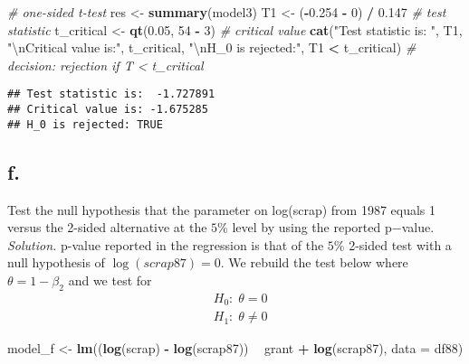 \documentclass[
]{article}
\newenvironment{Shaded}{\begin{snugshade}}{\end{snugshade}}
\newcommand{\CharTok}[1]{\textcolor[rgb]{0.31,0.60,0.02}{#1}}
\newcommand{\CommentTok}[1]{\textcolor[rgb]{0.56,0.35,0.01}{\textit{#1}}}
\newcommand{\DataTypeTok}[1]{\textcolor[rgb]{0.13,0.29,0.53}{#1}}
\newcommand{\DecValTok}[1]{\textcolor[rgb]{0.00,0.00,0.81}{#1}}
\newcommand{\FloatTok}[1]{\textcolor[rgb]{0.00,0.00,0.81}{#1}}
\newcommand{\KeywordTok}[1]{\textcolor[rgb]{0.13,0.29,0.53}{\textbf{#1}}}
\newcommand{\NormalTok}[1]{#1}
\newcommand{\OperatorTok}[1]{\textcolor[rgb]{0.81,0.36,0.00}{\textbf{#1}}}
\newcommand{\StringTok}[1]{\textcolor[rgb]{0.31,0.60,0.02}{#1}}
\begin{document}
\begin{Shaded}
\begin{Highlighting}[]
\CommentTok{# one-sided t-test}
\NormalTok{res <-}\StringTok{ }\KeywordTok{summary}\NormalTok{(model3)}
\NormalTok{T1 <-}\StringTok{ }\NormalTok{(}\OperatorTok{-}\FloatTok{0.254} \OperatorTok{-}\StringTok{ }\DecValTok{0}\NormalTok{) }\OperatorTok{/}\StringTok{ }\FloatTok{0.147} \CommentTok{# test statistic}
\NormalTok{t_critical <-}\StringTok{ }\KeywordTok{qt}\NormalTok{(}\FloatTok{0.05}\NormalTok{, }\DecValTok{54} \OperatorTok{-}\StringTok{ }\DecValTok{3}\NormalTok{) }\CommentTok{# critical value }
\KeywordTok{cat}\NormalTok{(}\StringTok{"Test statistic is: "}\NormalTok{, T1, }\StringTok{"}\CharTok{\textbackslash{}n}\StringTok{Critical value is:"}\NormalTok{, t_critical, }
    \StringTok{"}\CharTok{\textbackslash{}n}\StringTok{H_0 is rejected:"}\NormalTok{, T1 }\OperatorTok{<}\StringTok{ }\NormalTok{t_critical) }\CommentTok{# decision: rejection if T < t_critical}
\end{Highlighting}
\end{Shaded}

\begin{verbatim}
## Test statistic is:  -1.727891 
## Critical value is: -1.675285 
## H_0 is rejected: TRUE
\end{verbatim}

\newpage

\hypertarget{f.}{%
\subsection{f.~}\label{f.}}

Test the null hypothesis that the parameter on log(scrap) from 1987
equals 1 versus the 2-sided alternative at the \(5\%\) level by using
the reported p−value. \newline \newline \emph{Solution.} p-value
reported in the regression is that of the \(5\%\) 2-sided test with a
null hypothesis of \(\log(scrap87) = 0\). We rebuild the test below
where \(\theta = 1 - \beta_2\) and we test for \[\begin{aligned}
&H_0:\;\theta = 0 \\
&H_1 : \; \theta \ne 0
\end{aligned}\]

\begin{Shaded}
\begin{Highlighting}[]
\NormalTok{model_f <-}\StringTok{ }\KeywordTok{lm}\NormalTok{((}\KeywordTok{log}\NormalTok{(scrap) }\OperatorTok{-}\StringTok{ }\KeywordTok{log}\NormalTok{(scrap87)) }\OperatorTok{~}\StringTok{ }\NormalTok{grant }\OperatorTok{+}\StringTok{ }\KeywordTok{log}\NormalTok{(scrap87), }\DataTypeTok{data =}\NormalTok{ df88)}
\end{Highlighting}
\end{Shaded}
\end{document}
